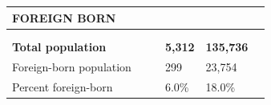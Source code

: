 \documentclass[9pt]{report}
\begin{document}
\newpage
\setlength{\tabcolsep}{.01in} %
\begin{tabular}{p{.10in}p{.10in}p{.10in}p{3.7in}>{\hfill}p{.85in}>{\hfill}p{.85in}>{\hfill}p{.85in}>{\hfill}p{.85in}p{0.1in}}
\multicolumn{9}{l}{\parbox{7.1in}{\raggedright{\large{\strut\textbf{FOREIGN BORN}\strut}}}} \\ 
\hline
\multicolumn{4}{l}{\parbox{3.5in}{\raggedright{\textbf{}}}} & \multicolumn{1}{r}{\parbox{.85in}{\strut\raggedleft{\textbf{}\strut}}} & \multicolumn{1}{r}{\parbox{.85in}{\strut\raggedleft{\textbf{}\strut}}} & \multicolumn{1}{r}{\parbox{.85in}{\strut{}}} & \multicolumn{1}{r}{\parbox{.85in}{\strut{}}} & \\ 
\multicolumn{9}{l}{} \\ 
\multicolumn{4}{l}{\parbox{3.5in}{\strut\raggedright{\textbf{Total population}\strut}}} & \textbf{} & \textbf{} & \textbf{5,312} & \textbf{135,736} & \textbf{} \\ 
\multicolumn{4}{l}{\parbox{3.6in}{\strut\raggedright{{Foreign-born population}}\strut}} &  &  & 299 & 23,754 & \multicolumn{1}{l}{}  \\ 
\multicolumn{4}{l}{\parbox{3.6in}{\strut\raggedright{{Percent foreign-born}}\strut}} &  &  & 6.0\% & 18.0\% & \multicolumn{1}{l}{}  \\ 

\end{tabular}
\setlength{\tabcolsep}{6pt} %
\end{document}
